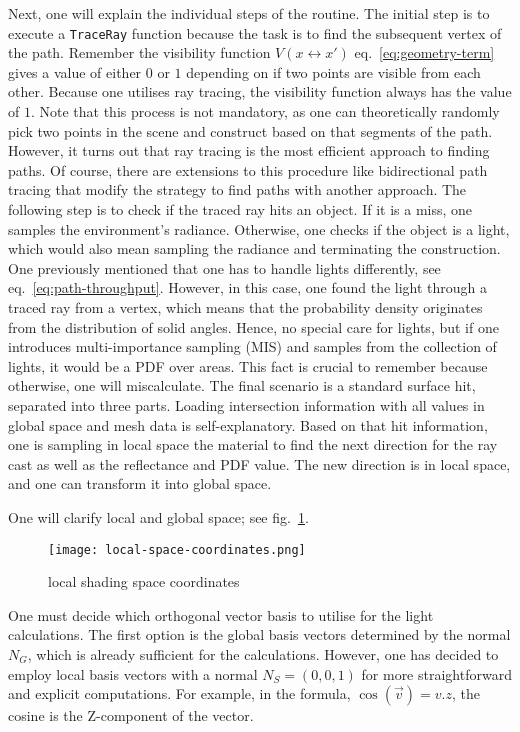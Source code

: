 Next, one will explain the individual steps of the routine.
The initial step is to execute a \texttt{TraceRay} function because the task is to find the subsequent vertex of the path.
Remember the visibility function $V(x \leftrightarrow x')$ eq.~\ref{eq:geometry-term} gives a value of either $0$ or $1$ depending on if two points are visible from each other.
Because one utilises ray tracing, the visibility function always has the value of $1$.
Note that this process is not mandatory, as one can theoretically randomly pick two points in the scene and construct based on that segments of the path.
However, it turns out that ray tracing is the most efficient approach to finding paths. 
Of course, there are extensions to this procedure like bidirectional path tracing that modify the strategy to find paths with another approach.
The following step is to check if the traced ray hits an object.
If it is a miss, one samples the environment's radiance.
Otherwise, one checks if the object is a light, which would also mean sampling the radiance and terminating the construction.
One previously mentioned that one has to handle lights differently, see 
eq.~\ref{eq:path-throughput}.
However, in this case, one found the light through a traced ray from a vertex, which means that the probability density originates from the distribution of solid angles.
Hence, no special care for lights, but if one introduces multi-importance sampling (MIS) and samples from the collection of lights, it would be a PDF over areas.
This fact is crucial to remember because otherwise, one will miscalculate.
The final scenario is a standard surface hit, separated into three parts.
Loading intersection information with all values in global space and mesh data is self-explanatory.
Based on that hit information, one is sampling in local space the material to find the next direction for the ray cast as well as the reflectance and PDF value.
The new direction is in local space, and one can transform it into global space.

One will clarify local and global space; see fig.~\ref{fig:local-space}.

\begin{figure}[h]
    \begin{center}
        \texttt{[image: local-space-coordinates.png]}
    \end{center}
    \caption{local shading space coordinates}
    \label{fig:local-space}
\end{figure}

One must decide which orthogonal vector basis to utilise for the light calculations.
The first option is the global basis vectors determined by the normal $N_G$, which is already sufficient for the calculations.
However, one has decided to employ local basis vectors with a normal $N_S = (0,0,1)$ for more straightforward and explicit computations.
For example, in the formula, $\cos(\vec{v})=v.z$, the cosine is the Z-component of the vector.

